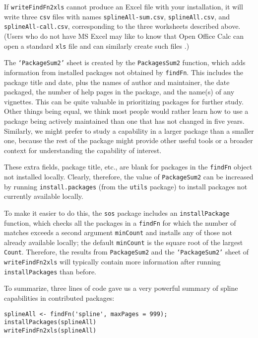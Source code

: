 If {\tt writeFindFn2xls} cannot produce an Excel file with
your installation, it will write three {\tt csv} files with
names {\tt splineAll-sum.csv}, {\tt splineAll.csv}, and
{\tt splineAll-call.csv}, corresponding to the three
worksheets described above. (Users who do not have MS Excel
may like to know that Open Office Calc can open a standard
{\tt xls} file and can similarly create such files
\citep{CALC09MAN}.)

The {\tt `PackageSum2'} sheet is created by the
{\tt PackagesSum2} function, which adds information from
installed packages not obtained by
{\tt findFn}.  This includes the package title and date, plus
the names of author and maintainer,
the date packaged, the number of help pages in the package,
and the name(s) of any vignettes.  This can be quite
valuable in prioritizing packages for further study.
Other things being equal, we think most people would
rather learn how to use a package being actively maintained
than one that has not changed in five years.  Similarly,
we might prefer to study a capability in a larger package
than a smaller one, because the rest of the package might
provide other useful tools or a broader context for
understanding the capability of interest.

These extra fields, package title, etc., are blank for
packages in the {\tt findFn} object not installed locally.
Clearly, therefore, the value of {\tt PackageSum2} can be
increased by running {\tt install.packages} (from the
{\tt utils} package) to install packages not currently
available locally.

To make it easier to do this, the {\tt sos} package includes
an {\tt installPackage} function, which checks all the
packages in a {\tt findFn} for which
the number of matches exceeds a second argument {\tt minCount}
and installs any of those not already available locally;  the
default {\tt minCount} is the square root of the largest
{\tt Count}.  Therefore, the results from {\tt PackageSum2} and the
{\tt `PackageSum2'} sheet of {\tt writeFindFn2xls} will typically
contain more information after running {\tt installPackages}
than before.

To summarize, three lines of code gave us a very powerful
summary of spline capabilities in contributed \R{}
packages:

\begin{verbatim}
splineAll <- findFn('spline', maxPages = 999);
installPackages(splineAll)
writeFindFn2xls(splineAll)
\end{verbatim}

